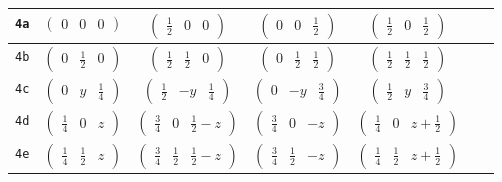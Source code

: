 \documentclass[fleqn,9pt,landscape]{jsarticle}
\begin{document}
\begin{center}
\begin{longtable}{ccccccc}
{\tt 4a} & $ \begin{pmatrix} 0 & 0 & 0 \end{pmatrix} $ & $ \begin{pmatrix} \frac{1}{2} & 0 & 0 \end{pmatrix} $ & $ \begin{pmatrix} 0 & 0 & \frac{1}{2} \end{pmatrix} $ & $ \begin{pmatrix} \frac{1}{2} & 0 & \frac{1}{2} \end{pmatrix} $ & $  $ & $  $ \\ \hline
{\tt 4b} & $ \begin{pmatrix} 0 & \frac{1}{2} & 0 \end{pmatrix} $ & $ \begin{pmatrix} \frac{1}{2} & \frac{1}{2} & 0 \end{pmatrix} $ & $ \begin{pmatrix} 0 & \frac{1}{2} & \frac{1}{2} \end{pmatrix} $ & $ \begin{pmatrix} \frac{1}{2} & \frac{1}{2} & \frac{1}{2} \end{pmatrix} $ & $  $ & $  $ \\ \hline
{\tt 4c} & $ \begin{pmatrix} 0 & y & \frac{1}{4} \end{pmatrix} $ & $ \begin{pmatrix} \frac{1}{2} & - y & \frac{1}{4} \end{pmatrix} $ & $ \begin{pmatrix} 0 & - y & \frac{3}{4} \end{pmatrix} $ & $ \begin{pmatrix} \frac{1}{2} & y & \frac{3}{4} \end{pmatrix} $ & $  $ & $  $ \\ \hline
{\tt 4d} & $ \begin{pmatrix} \frac{1}{4} & 0 & z \end{pmatrix} $ & $ \begin{pmatrix} \frac{3}{4} & 0 & \frac{1}{2} - z \end{pmatrix} $ & $ \begin{pmatrix} \frac{3}{4} & 0 & - z \end{pmatrix} $ & $ \begin{pmatrix} \frac{1}{4} & 0 & z + \frac{1}{2} \end{pmatrix} $ & $  $ & $  $ \\ \hline
{\tt 4e} & $ \begin{pmatrix} \frac{1}{4} & \frac{1}{2} & z \end{pmatrix} $ & $ \begin{pmatrix} \frac{3}{4} & \frac{1}{2} & \frac{1}{2} - z \end{pmatrix} $ & $ \begin{pmatrix} \frac{3}{4} & \frac{1}{2} & - z \end{pmatrix} $ & $ \begin{pmatrix} \frac{1}{4} & \frac{1}{2} & z + \frac{1}{2} \end{pmatrix} $ & $  $ & $  $ \\ \hline

\end{longtable}
\end{center}
\end{document}
